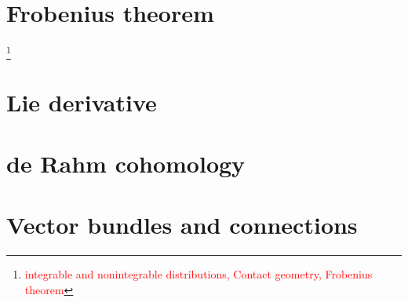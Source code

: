 \documentclass[nobib, a4paper]{tufte-book}
\theoremstyle{plain}
\theoremstyle{definition}
\theoremstyle{remark}
\newcommand{\Q}{\mathbb{Q}}
\newcommand{\R}{\mathbb{R}}
\newcommand{\todo}[1]{\footnote{\textcolor{red}{#1}}}
\begin{document}
\begin{appendices}
\chapter{Frobenius theorem}
\todo{integrable and nonintegrable distributions, Contact geometry, Frobenius theorem}
\chapter{Lie derivative}
\chapter{de Rahm cohomology}
\chapter{Vector bundles and connections}
\end{appendices}

  
  

\printbibliography
{}
\end{document}
